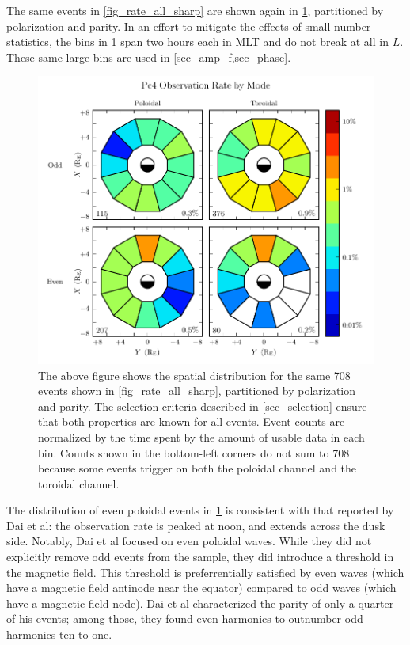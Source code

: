 The same events in \cref{fig_rate_all_sharp} are shown again in
\cref{fig_mode_all}, partitioned by polarization and parity. In an effort to
mitigate the effects of small number statistics, the bins in
\cref{fig_mode_all} span two hours each in MLT and do not break at all in $L$. 
These same large bins are used in \cref{sec_amp_f,sec_phase}. 

\begin{figure}[!htb]
  \centering
  \includegraphics[width=\textwidth]{figures/mode_all.pdf}
  \caption[Rate of Pc4 Events by Mode]{
    The above figure shows the spatial distribution for the same 708 events
    shown in \cref{fig_rate_all_sharp}, partitioned by polarization and parity.
    The selection criteria described in \cref{sec_selection} ensure that both
    properties are known for all events. Event counts are normalized by the
    time spent by the amount of usable data in each bin. Counts shown in the
    bottom-left corners do not sum to 708 because some events trigger on both
    the poloidal channel and the toroidal channel. 
  }
  \label{fig_mode_all}
\end{figure}

The distribution of even poloidal events in \cref{fig_mode_all} is
consistent with that reported by Dai et al\cite{dai_2015}: the observation rate
is peaked at noon, and extends across the dusk side. Notably, Dai et al focused
on even poloidal waves. While they did not explicitly remove odd events from
the sample, they did introduce a threshold in the magnetic field. This
threshold is
preferrentially satisfied by even waves (which have a magnetic field antinode
near the equator) compared to odd waves (which have a magnetic field node). 
Dai et al
characterized the parity of only a quarter of his events; among those, they
found even harmonics to outnumber odd harmonics ten-to-one. 

